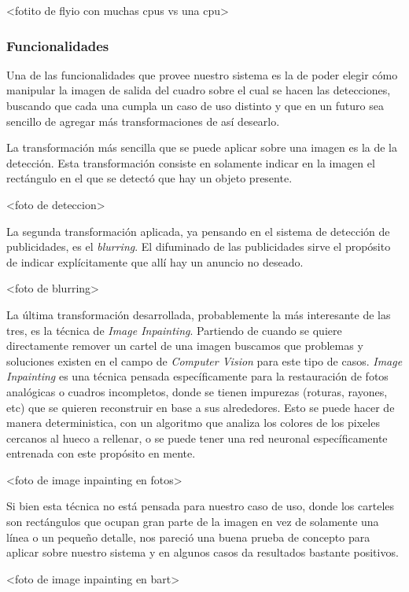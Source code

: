 \documentclass[a4paper]{article}
\begin{document}
<fotito de flyio con muchas cpus vs una cpu>

\subsubsection{Funcionalidades}

Una de las funcionalidades que provee nuestro sistema es la de poder elegir cómo manipular la imagen de salida del cuadro sobre el cual se hacen las detecciones, buscando que cada una cumpla un caso de uso distinto y que en un futuro sea sencillo de agregar más transformaciones de así desearlo.

La transformación más sencilla que se puede aplicar sobre una imagen es la de la detección. Esta transformación consiste en solamente indicar en la imagen el rectángulo en el que se detectó que hay un objeto presente.

<foto de deteccion>

La segunda transformación aplicada, ya pensando en el sistema de detección de publicidades, es el \textit{blurring}. El difuminado de las publicidades sirve el propósito de indicar explícitamente que allí hay un anuncio no deseado.

<foto de blurring>

La última transformación desarrollada, probablemente la más interesante de las tres, es la técnica de \textit{Image Inpainting}. Partiendo de cuando se quiere directamente remover un cartel de una imagen buscamos que problemas y soluciones existen en el campo de \textit{Computer Vision} para este tipo de casos. \textit{Image Inpainting} es una técnica pensada específicamente para la restauración de fotos analógicas o cuadros incompletos, donde se tienen impurezas (roturas, rayones, etc) que se quieren reconstruir en base a sus alrededores. Esto se puede hacer de manera deterministica, con un algoritmo que analiza los colores de los pixeles cercanos al hueco a rellenar, o se puede tener una red neuronal específicamente entrenada con este propósito en mente.

<foto de image inpainting en fotos>

Si bien esta técnica no está pensada para nuestro caso de uso, donde los carteles son rectángulos que ocupan gran parte de la imagen en vez de solamente una línea o un pequeño detalle, nos pareció una buena prueba de concepto para aplicar sobre nuestro sistema y en algunos casos da resultados bastante positivos.

<foto de image inpainting en bart>
\end{document}
